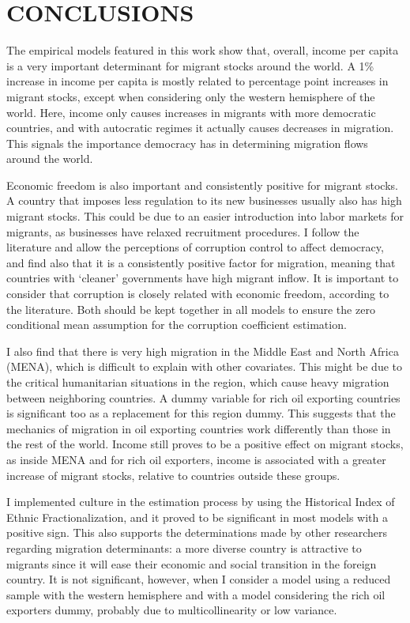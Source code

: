 \documentclass[../main.tex]{subfiles}
\begin{document}
\section{CONCLUSIONS}
The empirical models featured in this work show that, overall, income per capita is a very important determinant for migrant stocks around the world. A 1\% increase in income per capita is mostly related to percentage point increases in migrant stocks, except when considering only the western hemisphere of the world. Here, income only causes increases in migrants with more democratic countries, and with autocratic regimes it actually causes decreases in migration. This signals the importance democracy has in determining migration flows around the world. 

Economic freedom is also important and consistently positive for migrant stocks. A country that imposes less regulation to its new businesses usually also has high migrant stocks. This could be due to an easier introduction into labor markets for migrants, as businesses have relaxed recruitment procedures. I follow the literature and allow the perceptions of corruption control to affect democracy, and find also that it is a consistently positive factor for migration, meaning that countries with ‘cleaner’ governments have high migrant inflow. It is important to consider that corruption is closely related with economic freedom, according to the literature. Both should be kept together in all models to ensure the zero conditional mean assumption for the corruption coefficient estimation.

I also find that there is very high migration in the Middle East and North Africa (MENA), which is difficult to explain with other covariates. This might be due to the critical humanitarian situations in the region, which cause heavy migration between neighboring countries. A dummy variable for rich oil exporting countries is significant too as a replacement for this region dummy. This suggests that the mechanics of migration in oil exporting countries work differently than those in the rest of the world. Income still proves to be a positive effect on migrant stocks, as inside MENA and for rich oil exporters, income is associated with a greater increase of migrant stocks, relative to countries outside these groups.

I implemented culture in the estimation process by using the Historical Index of Ethnic Fractionalization, and it proved to be significant in most models with a positive sign. This also supports the determinations made by other researchers regarding migration determinants: a more diverse country is attractive to migrants since it will ease their economic and social transition in the foreign country. It is not significant, however, when I consider a model using a reduced sample with the western hemisphere and with a model considering the rich oil exporters dummy, probably due to multicollinearity or low variance.
\end{document}
